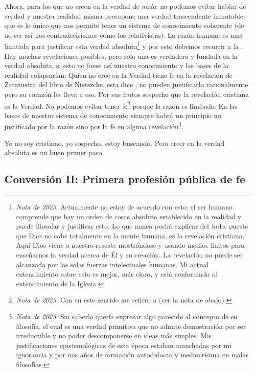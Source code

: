 \documentclass[12pt]{article}
\begin{document}
	Ahora, para los que no creen en la verdad de \textit{nada}: no podemos
	evitar hablar de verdad y nuestra realidad misma presupone una verdad
	trascendente inmutable que es lo único que nos permite tener un
	sistema de conocimiento coherente (de no ser así nos contradeciríamos
	como los relativistas). La razón humana es muy limitada para justificar
	esta verdad absoluta\footnote{\textit{Nota de 2023}: Actualmente no
	estoy de acuerdo con esto: el
	ser humano comprende que hay un orden de cosas absoluto establecido en
	la realidad y puede filosofar y justificar esto. Lo que nunca podrá
	explicar del todo, puesto que Dios no cabe totalmente en la mente
	humana, es la revelación cristiana. Aquí Dios viene a nuestro rescate
	mostrándose y usando medios finitos para enseñarnos la verdad acerca de
	Él y su creación. La revelación no puede ser alcanzada por las solas
	fuerzas intelectuales humanas. Mi actual entendimiento sobre esto es
	mejor, más claro, y está conformado al entendimiento de la Iglesia.} y
	por esto debemos recurrir a la .
	Hay muchas revelaciones posibles, pero solo una es verdadera y fundada
	en la verdad absoluta, si esto no fuese así nuestro conocimiento y las
	bases de la realidad colapsarían. Quien no cree en la Verdad tiene fe en
	la revelación de Zaratustra del libro  de Nietszche,
	esta dice , no pueden justificarlo
	racionalmente pero su corazón les lleva a eso. Por sus frutos sospecho
	que la revelación cristiana es la Verdad. No podemos evitar tener
	fe\footnote{\textit{Nota de 2023}: Con  en este sentido me
	refiero a  (ver la nota de abajo).} porque la razón es limitada. En las
	bases de nuestro
	sistema de conocimiento siempre habrá un principio no justificado por la
	razón sino por la fe en alguna
	revelación\footnote{\textit{Nota de 2023}:
	Sin saberlo quería expresar algo parecido al concepto de
	 en filosofía, el cual es una verdad
	primitiva que no admite demostración por ser irreductible y no poder
	descomponerse en ideas más simples. Mis justificaciones epistemológicas
	de esta época estaban manchadas por mi ignorancia y por mis años de
	formación autodidacta y mediocrísima en malas filosofías.}.

	Yo no soy cristiano, yo sospecho, estoy buscando. Pero creer en la
	verdad absoluta es un buen primer paso.

	\newpage

	\subsection{Conversión II: Primera profesión pública de fe}
\end{document}
